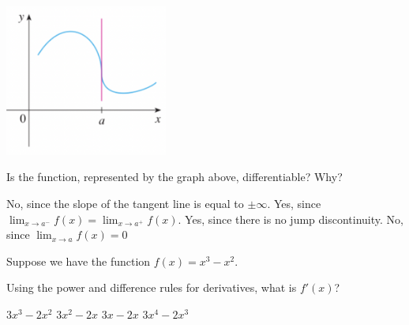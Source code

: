 \documentclass[addpoints, 12pt]{exam}%
\newcommand{\spc}{\vspace*{0.5cm}}
\begin{document}
\begin{questions}
\question[1]
\includegraphics[width=0.4\textwidth]{Hw4graph.png}

Is the function, represented by the graph above, differentiable? Why?

\begin{choices}
\CorrectChoice No, since the slope of the tangent line is equal to $\pm \infty$.
\choice Yes, since $\lim_{x \to a^-} f(x) = \lim_{x \to a^+} f(x)$.
\choice Yes, since there is no jump discontinuity.
\choice No, since $\lim_{x \to a} f(x) = 0$
\end{choices}

\spc

\question[1]
Suppose we have the function $f(x) = x^3 - x^2$.

Using the power and difference rules for derivatives, what is $f'(x)$?

\begin{choices}
\choice $3x^3 - 2x^2$
\CorrectChoice $3x^2 - 2x$
\choice $3x - 2x$
\choice $3x^4 - 2x^3$
\end{choices}

\spc

\end{questions}
\end{document}
